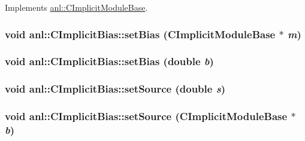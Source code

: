 Implements \hyperlink{classanl_1_1CImplicitModuleBase_ab88f8a1822dcfbc13ba5230318b0acd1}{anl::CImplicitModuleBase}.\hypertarget{classanl_1_1CImplicitBias_a0f7add9e5a0a82868795a7f1b7e6bcae}{
\subsubsection[{setBias}]{\setlength{\rightskip}{0pt plus 5cm}void anl::CImplicitBias::setBias ({\bf CImplicitModuleBase} $\ast$ {\em m})}}
\label{classanl_1_1CImplicitBias_a0f7add9e5a0a82868795a7f1b7e6bcae}
\hypertarget{classanl_1_1CImplicitBias_a17cca1b9edba91f27cd91e05861cb2c7}{
\subsubsection[{setBias}]{\setlength{\rightskip}{0pt plus 5cm}void anl::CImplicitBias::setBias (double {\em b})}}
\label{classanl_1_1CImplicitBias_a17cca1b9edba91f27cd91e05861cb2c7}
\hypertarget{classanl_1_1CImplicitBias_a73a88a5c2526b8d52b1445cddf804dd8}{
\subsubsection[{setSource}]{\setlength{\rightskip}{0pt plus 5cm}void anl::CImplicitBias::setSource (double {\em s})}}
\label{classanl_1_1CImplicitBias_a73a88a5c2526b8d52b1445cddf804dd8}
\hypertarget{classanl_1_1CImplicitBias_aef5b1aaa27cf36d9746b76b5ce9b631d}{
\subsubsection[{setSource}]{\setlength{\rightskip}{0pt plus 5cm}void anl::CImplicitBias::setSource ({\bf CImplicitModuleBase} $\ast$ {\em b})}}
\label{classanl_1_1CImplicitBias_aef5b1aaa27cf36d9746b76b5ce9b631d}


